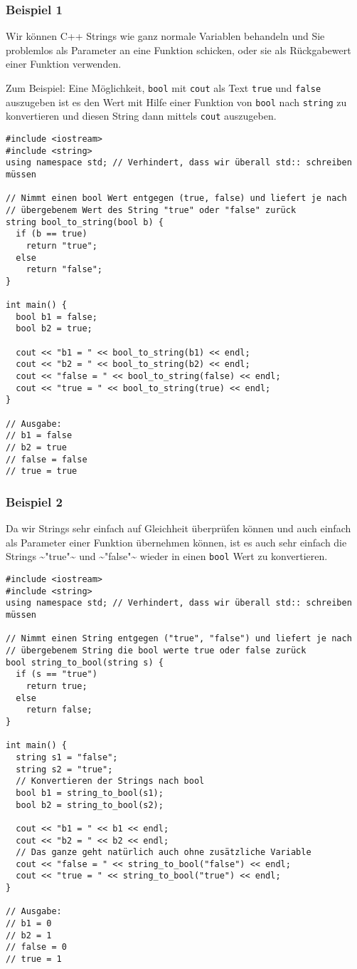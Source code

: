 \documentclass[11pt]{article}
\begin{document}
\subsubsection{Beispiel 1}
\label{sec-4-6-5}
Wir können C++ Strings wie ganz normale Variablen behandeln und Sie
problemlos als Parameter an eine Funktion schicken, oder sie als
Rückgabewert einer Funktion verwenden. 

Zum Beispiel: Eine Möglichkeit, \verb~bool~ mit \verb~cout~ als Text \verb~true~ und
\verb~false~ auszugeben ist es den Wert mit Hilfe einer Funktion von \verb~bool~
nach \verb~string~ zu konvertieren und diesen String dann mittels \verb~cout~
auszugeben.

\begin{verbatim}
#include <iostream>
#include <string>
using namespace std; // Verhindert, dass wir überall std:: schreiben müssen

// Nimmt einen bool Wert entgegen (true, false) und liefert je nach
// übergebenem Wert des String "true" oder "false" zurück
string bool_to_string(bool b) {
  if (b == true)
    return "true";
  else
    return "false";
}

int main() {
  bool b1 = false;
  bool b2 = true;

  cout << "b1 = " << bool_to_string(b1) << endl;
  cout << "b2 = " << bool_to_string(b2) << endl;
  cout << "false = " << bool_to_string(false) << endl;
  cout << "true = " << bool_to_string(true) << endl;
}

// Ausgabe:
// b1 = false
// b2 = true
// false = false
// true = true
\end{verbatim}
\subsubsection{Beispiel 2}
\label{sec-4-6-6}
Da wir Strings sehr einfach auf Gleichheit überprüfen können und auch
einfach als Parameter einer Funktion übernehmen können, ist es auch
sehr einfach die Strings \textasciitilde{}"true"\textasciitilde{} und \textasciitilde{}"false"\textasciitilde{} wieder in einen \verb~bool~
Wert zu konvertieren.
\begin{verbatim}
#include <iostream>
#include <string>
using namespace std; // Verhindert, dass wir überall std:: schreiben müssen

// Nimmt einen String entgegen ("true", "false") und liefert je nach
// übergebenem String die bool werte true oder false zurück
bool string_to_bool(string s) {
  if (s == "true")
    return true;
  else
    return false;
}

int main() {
  string s1 = "false";
  string s2 = "true";
  // Konvertieren der Strings nach bool
  bool b1 = string_to_bool(s1);
  bool b2 = string_to_bool(s2);

  cout << "b1 = " << b1 << endl;
  cout << "b2 = " << b2 << endl;
  // Das ganze geht natürlich auch ohne zusätzliche Variable
  cout << "false = " << string_to_bool("false") << endl;
  cout << "true = " << string_to_bool("true") << endl;
}

// Ausgabe:
// b1 = 0
// b2 = 1
// false = 0
// true = 1
\end{verbatim}
\end{document}
